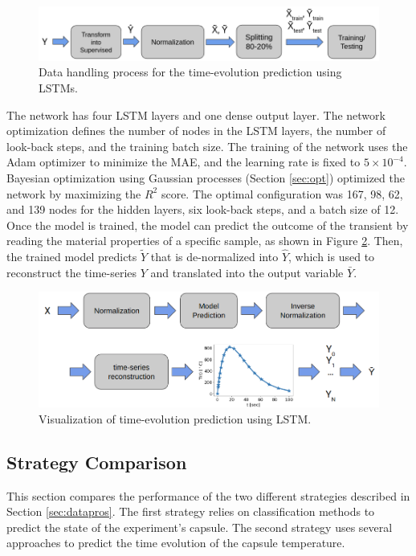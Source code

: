 \begin{figure}[htbp!] %
  \centering
  \includegraphics[width=0.7\linewidth]{figures/data-pross-lstm}
  \caption{Data handling process for the time-evolution prediction using LSTMs.}
  \label{fig:data-lstm}
\end{figure}

The network has four LSTM layers and one dense output layer.
The network optimization defines the number of nodes in the LSTM layers, the number of look-back steps, and the training batch size.
The training of the network uses the Adam optimizer to minimize the \gls*{MAE}, and the learning rate is fixed to $5 \times 10^{-4}$.
Bayesian optimization using Gaussian processes (Section \ref{sec:opt}) optimized the network by maximizing the $R^2$ score.
The optimal configuration was 167, 98, 62, and 139 nodes for the hidden layers, six look-back steps, and a batch size of 12.
Once the model is trained, the model can predict the outcome of the transient by reading the material properties of a specific sample, as shown in Figure \ref{fig:data-reg3}.
Then, the trained model predicts $\tilde{Y}$ that is de-normalized into $\hat{Y}$, which is used to reconstruct the time-series $Y$ and translated into the output variable $\bar{Y}$.

\begin{figure}[htbp!] %
  \centering
  \includegraphics[width=0.7\linewidth]{figures/data-prediction-lstm}
  \caption{Visualization of time-evolution prediction using LSTM.}
  \label{fig:data-reg3}
\end{figure}


\subsection{Strategy Comparison}
\label{sec:comp}

This section compares the performance of the two different strategies described in Section \ref{sec:datapros}.
The first strategy relies on classification methods to predict the state of the experiment's capsule.
The second strategy uses several approaches to predict the time evolution of the capsule temperature.

